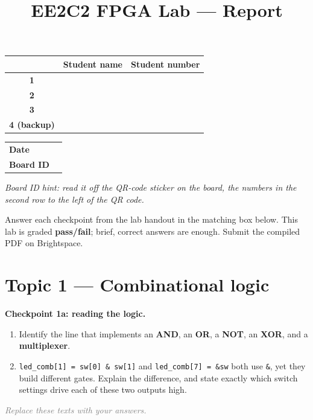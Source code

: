 \documentclass[11pt]{article}
\title{\textcolor{tudelft}{\textbf{EE2C2 FPGA Lab --- Report}}}
\author{}
\date{}
\newcommand{\answerbox}[2]{%
  \begin{tcolorbox}[colback=ansbg,colframe=tudelft,boxrule=0.8pt,title={#1},
                    fonttitle=\bfseries\small]#2\end{tcolorbox}}
\newcommand{\ans}{\underline{\hspace{6cm}}}
\begin{document}
\maketitle
\thispagestyle{fancy}
\vspace{-2.5em}

\begin{center}
\begin{tabular}{@{}>{\bfseries}c p{7cm} p{4.5cm}@{}}
\toprule
 & Student name & Student number \\ \midrule
1 & & \\[6pt]
2 & & \\[6pt]
3 & & \\[6pt]
4 (backup) & & \\
\bottomrule
\end{tabular}
\end{center}

\vspace{0.3em}
\begin{center}
\begin{tabular}{@{}>{\bfseries}p{4cm}p{10cm}@{}}
\toprule
Date & \ans \\[2pt]
Board ID & \ans \\
\bottomrule
\end{tabular}
\end{center}
\noindent\footnotesize\textit{Board ID hint: read it off the QR-code sticker on the board, the numbers in the
second row to the left of the QR code.}\normalsize

\noindent\small Answer each checkpoint from the lab handout in the matching box below. This lab is graded
\textbf{pass/fail}; brief, correct answers are enough. Submit the compiled PDF on Brightspace.\normalsize

\section*{Topic 1 --- Combinational logic}

\noindent\textbf{Checkpoint 1a: reading the logic.}
\begin{enumerate}[noitemsep]
  \item Identify the line that implements an \textbf{AND}, an \textbf{OR}, a \textbf{NOT}, an \textbf{XOR},
        and a \textbf{multiplexer}.
  \item \texttt{led\_comb[1] = sw[0] \& sw[1]} and \texttt{led\_comb[7] = \&sw} both use \texttt{\&}, yet
        they build different gates. Explain the difference, and state exactly which switch settings drive
        each of these two outputs high.
\end{enumerate}
\answerbox{Your answer}{\textcolor{gray}{\textit{Replace these texts with your answers.}}\par\rule{0pt}{0.16\textheight}}
\end{document}
